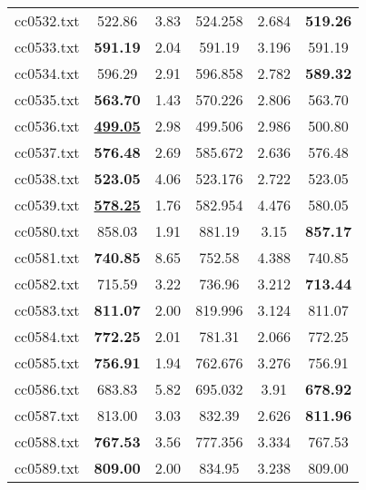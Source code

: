 \begin{table}[ht]
\begin{tabular}{c c c c c c}
cc0532.txt & 522.86 & 3.83 & 524.258 & 2.684 & \bf{519.26}\\
cc0533.txt & \bf{591.19} & 2.04 & 591.19 & 3.196 & 591.19\\
cc0534.txt & 596.29 & 2.91 & 596.858 & 2.782 & \bf{589.32}\\
cc0535.txt & \bf{563.70} & 1.43 & 570.226 & 2.806 & 563.70\\
cc0536.txt & \bf{\underline{499.05}} & 2.98 & 499.506 & 2.986 & 500.80\\
cc0537.txt & \bf{576.48} & 2.69 & 585.672 & 2.636 & 576.48\\
cc0538.txt & \bf{523.05} & 4.06 & 523.176 & 2.722 & 523.05\\
cc0539.txt & \bf{\underline{578.25}} & 1.76 & 582.954 & 4.476 & 580.05\\
cc0580.txt & 858.03 & 1.91 & 881.19 & 3.15 & \bf{857.17}\\
cc0581.txt & \bf{740.85} & 8.65 & 752.58 & 4.388 & 740.85\\
cc0582.txt & 715.59 & 3.22 & 736.96 & 3.212 & \bf{713.44}\\
cc0583.txt & \bf{811.07} & 2.00 & 819.996 & 3.124 & 811.07\\
cc0584.txt & \bf{772.25} & 2.01 & 781.31 & 2.066 & 772.25\\
cc0585.txt & \bf{756.91} & 1.94 & 762.676 & 3.276 & 756.91\\
cc0586.txt & 683.83 & 5.82 & 695.032 & 3.91 & \bf{678.92}\\
cc0587.txt & 813.00 & 3.03 & 832.39 & 2.626 & \bf{811.96}\\
cc0588.txt & \bf{767.53} & 3.56 & 777.356 & 3.334 & 767.53\\
cc0589.txt & \bf{809.00} & 2.00 & 834.95 & 3.238 & 809.00\\
[1ex]\hline
\end{tabular}
\label{table:nonlin}
\end{table}


